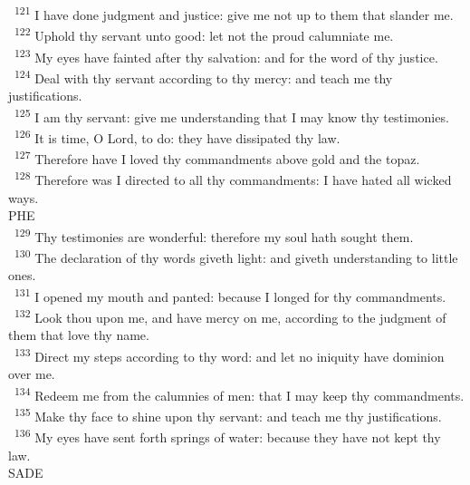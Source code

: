 \documentclass[a5paper,12pt]{article}
\begin{document}
\begin{multicols*}{2}
~\textsuperscript{121} I have done judgment and justice: give me not up to them that slander me.\\
~\textsuperscript{122} Uphold thy servant unto good: let not the proud calumniate me.\\
~\textsuperscript{123} My eyes have fainted after thy salvation: and for the word of thy justice.\\
~\textsuperscript{124} Deal with thy servant according to thy mercy: and teach me thy justifications.\\
~\textsuperscript{125} I am thy servant: give me understanding that I may know thy testimonies.\\
~\textsuperscript{126} It is time, O Lord, to do: they have dissipated thy law.\\
~\textsuperscript{127} Therefore have I loved thy commandments above gold and the topaz.\\
~\textsuperscript{128} Therefore was I directed to all thy commandments: I have hated all wicked ways.\\

PHE\\

~\textsuperscript{129} Thy testimonies are wonderful: therefore my soul hath sought them.\\
~\textsuperscript{130} The declaration of thy words giveth light: and giveth understanding to little ones.\\
~\textsuperscript{131} I opened my mouth and panted: because I longed for thy commandments.\\
~\textsuperscript{132} Look thou upon me, and have mercy on me, according to the judgment of them that love thy name.\\
~\textsuperscript{133} Direct my steps according to thy word: and let no iniquity have dominion over me.\\
~\textsuperscript{134} Redeem me from the calumnies of men: that I may keep thy commandments.\\
~\textsuperscript{135} Make thy face to shine upon thy servant: and teach me thy justifications.\\
~\textsuperscript{136} My eyes have sent forth springs of water: because they have not kept thy law.\\

SADE\\


\end{multicols*}
\end{document}
